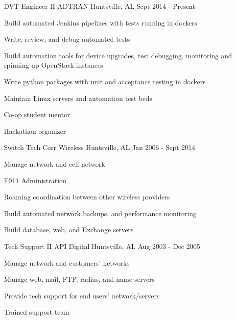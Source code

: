 
\begin{cventries}
  \cventry
    {DVT Engineer II} %
    {ADTRAN} %
    {Huntsville, AL} %
    {Sept 2014 - Present} %
    {
      \begin{cvitems} %
        \item {Build automated Jenkins pipelines with tests running in dockers}
        \item {Write, review, and debug automated tests}
        \item {Build automation tools for device upgrades, test debugging, monitoring and spinning up OpenStack instances}
        \item {Write python packages with unit and acceptance testing in dockers}
        \item {Maintain Linux servers and automation test beds}
        \item {Co-op student mentor}
        \item {Hackathon organizer}
      \end{cvitems}
    }

  \cventry
    {Switch Tech} %
    {Corr Wireless} %
    {Huntsville, AL} %
    {Jan 2006 - Sept 2014} %
    {
      \begin{cvitems} %
        \item {Manage network and cell network}
        \item {E911 Administration}
        \item {Roaming coordination between other wireless providers}
        \item {Build automated network backups, and performance monitoring}
        \item {Build database, web, and Exchange servers}
      \end{cvitems}
    }

  \cventry
    {Tech Support II} %
    {API Digital} %
    {Huntsville, AL} %
    {Aug 2003 - Dec 2005} %
    {
      \begin{cvitems} %
        \item {Manage network and customers' networks}
        \item {Manage web, mail, FTP, radius, and name servers}
        \item {Provide tech support for end users' network/servers}
        \item {Trained support team}
      \end{cvitems}
    }

\end{cventries}
